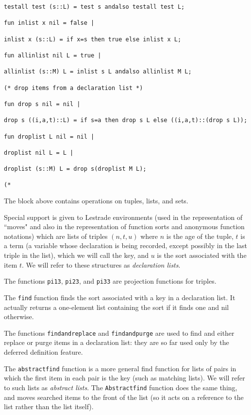 \documentclass{article}
\begin{document}
\begin{verbatim}
testall test (s::L) = test s andalso testall test L;

fun inlist x nil = false |

inlist x (s::L) = if x=s then true else inlist x L;

fun allinlist nil L = true |

allinlist (s::M) L = inlist s L andalso allinlist M L;

(* drop items from a declaration list *)

fun drop s nil = nil |

drop s ((i,a,t)::L) = if s=a then drop s L else ((i,a,t)::(drop s L));

fun droplist L nil = nil |

droplist nil L = L |

droplist (s::M) L = drop s(droplist M L);

(*

\end{verbatim}

The block above contains operations on tuples, lists, and sets.

Special support is given to Lestrade environments (used in the representation of ``moves" and also in the representation of function sorts and anonymous function notations) which are lists
of triples $(n,t,u)$ where $n$ is the age of the tuple, $t$ is a term (a variable whose declaration is being recorded, except possibly in the last triple in the list), which we will call the key,
and $u$ is the sort associated with the item $t$.  We will refer to these structures as {\em declaration lists\/}.

The functions {\tt pi13}, {\tt pi23}, and {\tt pi33} are projection functions for triples.

The {\tt find} function finds the sort associated with a key in a declaration list.  It actually returns a one-element list containing the sort if it finds one and nil otherwise.

The functions {\tt findandreplace} and {\tt findandpurge} are used to find and either replace or purge items in a declaration list:  they are so far used only by the deferred definition feature.

The {\tt abstractfind} function is a more general find function for lists of pairs in which the first item in each pair is the key (such as matching lists).  We will refer to such lists as {\em abstract lists\/}.  The {\tt Abstractfind} function does the same thing, and moves searched items to the front of the list (so it acts on a reference to the list rather than the list itself).
\end{document}
